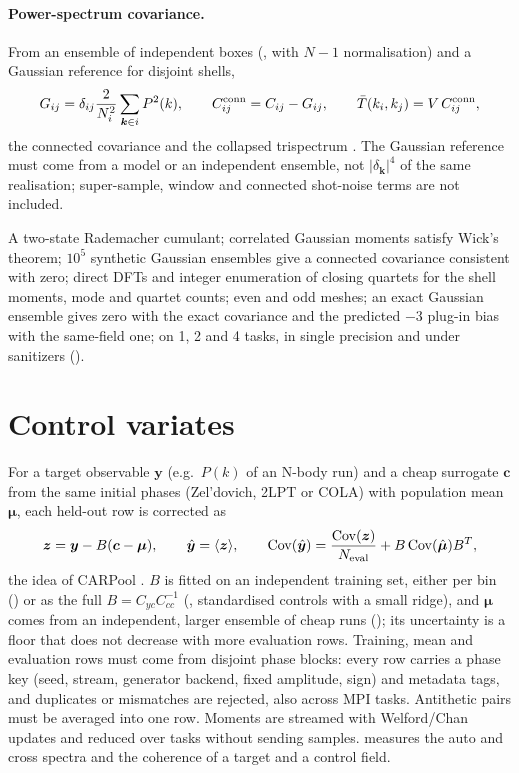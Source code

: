 \paragraph*{Power-spectrum covariance.} From an ensemble of independent boxes (, with $N-1$ normalisation) and a Gaussian
reference for disjoint shells,
\begin{equation}
G_{ij}=\delta_{ij}\frac{2}{N_i^2}\sum_{\bm k\in i}P^2(k),\qquad
C^{\rm conn}_{ij}=C_{ij}-G_{ij},\qquad \bar T(k_i,k_j)=V\,C^{\rm conn}_{ij},
\end{equation}
the connected covariance and the collapsed trispectrum \cite{Scoccimarro1999}. The Gaussian reference must come from a model or an independent
ensemble, not $|\delta_{\bm k}|^4$ of the same realisation; super-sample, window and connected shot-noise terms are not included.

\begin{validation}
A two-state Rademacher cumulant; correlated Gaussian moments satisfy Wick's theorem; $10^5$ synthetic Gaussian ensembles give a connected covariance
consistent with zero; direct DFTs and integer enumeration of closing quartets for the shell moments, mode and quartet counts; even and odd meshes; an
exact Gaussian ensemble gives zero with the exact covariance and the predicted $-3$ plug-in bias with the same-field one; on 1, 2 and 4 tasks, in single
precision and under sanitizers ().
\end{validation}

\section{Control variates}\label{sec:ens-cv}

For a target observable $\bm y$ (e.g.\ $P(k)$ of an N-body run) and a cheap surrogate $\bm c$ from the same initial phases (Zel'dovich, 2LPT or COLA)
with population mean $\bm\mu$, each held-out row is corrected as
\begin{equation}
\bm z=\bm y-B(\bm c-\bm\mu),\qquad\hat{\bm y}=\langle\bm z\rangle,\qquad
{\rm Cov}(\hat{\bm y})=\frac{{\rm Cov}(\bm z)}{N_{\rm eval}}+B\,{\rm Cov}(\hat{\bm\mu})B^T,
\end{equation}
the idea of CARPool \cite{Chartier2021}. $B$ is fitted on an independent training set, either per bin () or as the full
$B=C_{yc}C_{cc}^{-1}$ (, standardised controls with a small ridge), and $\bm\mu$ comes from an independent, larger ensemble of cheap runs
(); its uncertainty is a floor that does not decrease with more evaluation rows. Training, mean and evaluation rows must come from
disjoint phase blocks: every row carries a phase key (seed, stream, generator backend, fixed amplitude, sign) and metadata tags, and duplicates or
mismatches are rejected, also across MPI tasks. Antithetic pairs must be averaged into one row. Moments are streamed with Welford/Chan updates and reduced
over tasks without sending samples.  measures the auto and cross spectra and the coherence of a target and a control field.

